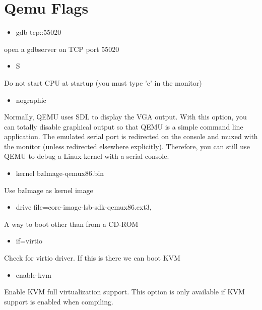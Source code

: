 \documentclass[letterpaper,10pt,titlepage]{article}
\begin{document}
\section{Qemu Flags}

\begin{itemize}
\item gdb tcp::55020
\end{itemize}

open a gdbserver on TCP port 55020

\begin{itemize}
\item S
\end{itemize}

Do not start CPU at startup (you must type ’c’ in the monitor)

\begin{itemize}
\item nographic 
\end{itemize}

\sloppy Normally, QEMU uses SDL to display the VGA output. With this option, you can totally disable graphical output so that QEMU is a simple command line application. The emulated serial port is redirected on the console and muxed with the monitor (unless redirected elsewhere explicitly). Therefore, you can still use QEMU to debug a Linux kernel with a serial console. 

\begin{itemize}
\item kernel bzImage-qemux86.bin 
\end{itemize}

Use bzImage as kernel image

\begin{itemize}
\item drive file=core-image-lsb-sdk-qemux86.ext3, 
\end{itemize}

A way to boot other than from a CD-ROM

\begin{itemize}
\item if=virtio 
\end{itemize}

Check for virtio driver. If this is there we can boot KVM

\begin{itemize}
\item enable-kvm  
\end{itemize}

Enable KVM full virtualization support. This option is only available if KVM support is enabled when compiling.
\end{document}
